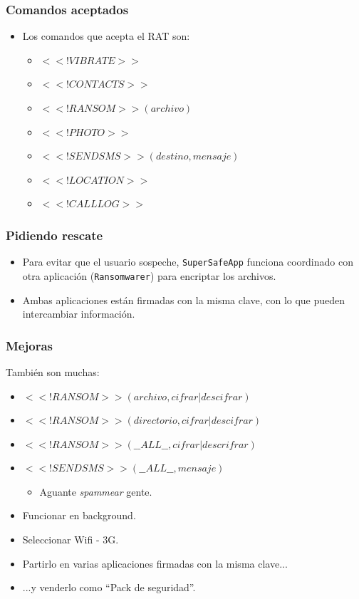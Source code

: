 \documentclass[ignorenonframetext,]{beamer}
\begin{document}
\begin{frame}\frametitle{Comandos aceptados}
	\begin{itemize}
		\item Los comandos que acepta el RAT son:
		\begin{itemize}
			\item $<<!VIBRATE>>$
			\item $<<!CONTACTS>>$
			\item $<<!RANSOM>>(archivo)$
			\item $<<!PHOTO>>$
			\item $<<!SENDSMS>>(destino,mensaje)$
			\item $<<!LOCATION>>$
			\item $<<!CALLLOG>>$
		\end{itemize}
	\end{itemize}
\end{frame}

\begin{frame}\frametitle{Pidiendo rescate}
	\begin{itemize}[<+->]
		\item Para evitar que el usuario sospeche, \texttt{SuperSafeApp} funciona coordinado con otra aplicación (\texttt{Ransomwarer}) para encriptar los archivos. 
		\item Ambas aplicaciones están firmadas con la misma clave, con lo que pueden intercambiar información.
	\end{itemize}
\end{frame}

\begin{frame}\frametitle{Mejoras}
	También son muchas:
	\begin{itemize}[<+->]
		\item $<<!RANSOM>>(archivo, cifrar|descifrar)$
		\item $<<!RANSOM>>(directorio, cifrar|descifrar)$
		\item $<<!RANSOM>>(\_\_ALL\_\_, cifrar|descrifrar)$
		\item $<<!SENDSMS>>(\_\_ALL\_\_, mensaje)$
		\begin{itemize}
			\item Aguante \emph{spammear} gente.
		\end{itemize}
		\item Funcionar en background.
		\item Seleccionar Wifi - 3G.
		\item Partirlo en varias aplicaciones firmadas con la misma clave...
		\item ...y venderlo como ``Pack de seguridad''.
	\end{itemize}	
\end{frame}
\end{document}
